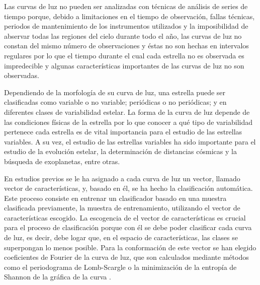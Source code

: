 \documentclass[letterpaper,12pt]{book}
\begin{document}
Las curvas de luz no pueden ser analizadas con técnicas de análisis de series de tiempo porque, debido a limitaciones en el tiempo de observación, fallas técnicas, periodos de mantenimiento de los instrumentos utilizados y la imposibilidad de abservar todas las regiones del cielo durante todo el año, las curvas de luz no constan del mismo número de observaciones y éstas no son hechas en intervalos regulares por lo que el tiempo durante el cual cada estrella no es observada es impredecible y algunas características importantes de las curvas de luz no son observadas. 

Dependiendo de la morfología de su curva de luz, una estrella puede ser clasificadas como variable o no variable; periódicas o no periódicas; y en diferentes clases de variabilidad estelar. La forma de la curva de luz depende de las condiciones físicas de la estrella por lo que conocer a qué tipo de variabilidad pertenece cada estrella es de vital importancia para el estudio de las estrellas variables. A su vez, el estudio de las estrellas variables ha sido importante para el estudio de la evolución estelar, la determinación de distancias cósmicas y la búsqueda de exoplanetas, entre otras. 

En estudios previos \cite{debosscher_automated_2007, sarro_automated_2009, richards_machine-learned_2011} se le ha asignado a cada curva de luz un vector, llamado vector de características, y, basado en él, se ha hecho la clasificación automática. Este proceso consiste en entrenar un clasificador basado en una muestra clasificada previamente, la  muestra de entrenamiento, utilizando el vector de características escogido. La escogencia de el vector de características es crucial para el proceso de clasificación porque con él se debe poder clasificar cada curva de luz, es decir, debe logar que, en el espacio de características, las clases se superpongan lo menos posible. Para la conformación de este vector se han elegido coeficientes de Fourier de la curva de luz\cite{debosscher_automated_2007, sarro_automated_2009, richards_machine-learned_2011}, que son calculados mediante métodos como el periodograma de  Lomb-Scargle \cite{scargle_studies_1982} o la minimización de la entropía de Shannon de la gráfica de la curva \cite{cincotta_astronomical_1995}. 
\end{document}
